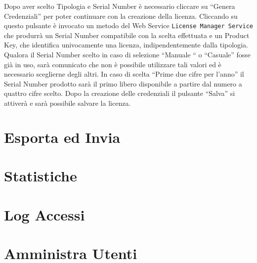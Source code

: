 Dopo aver scelto Tipologia e Serial Number è necessario cliccare su “Genera Credenziali” per poter continuare con la creazione della licenza. Cliccando su questo pulsante è invocato un metodo del Web Service \texttt{License Manager Service} che produrrà un Serial Number compatibile con la scelta effettuata e un Product Key, che identifica univocamente una licenza, indipendentemente dalla tipologia. Qualora il Serial Number scelto in caso di selezione “Manuale “ o “Casuale” fosse già in uso, sarà comunicato che non è possibile utilizzare tali valori ed è necessario sceglierne degli altri. In caso di scelta “Prime due cifre per l’anno” il Serial Number prodotto sarà il primo libero disponibile a partire dal numero a quattro cifre scelto. Dopo la creazione delle credenziali il pulsante “Salva” si attiverà e sarà possibile salvare la licenza. 



\section{Esporta ed Invia}

\section{Statistiche}


\section{Log Accessi}


\section{Amministra Utenti}

